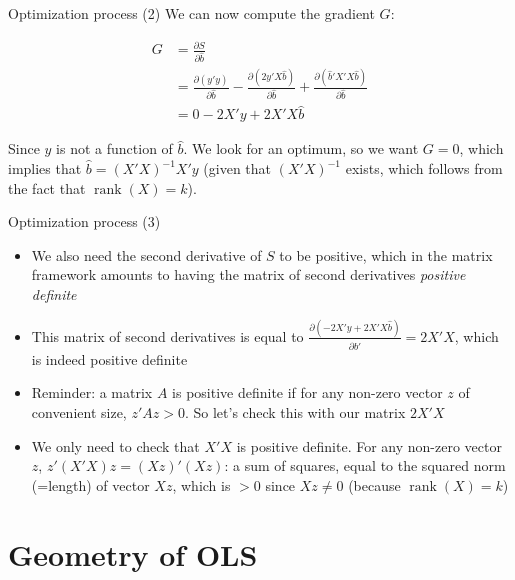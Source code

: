 \documentclass[aspectratio=169]{beamer}
\begin{document}
\begin{frame}{Optimization process (2)}
We can now compute the gradient $G$:

\begin{align*}
G &= \frac{\partial S}{\partial \hat{b}}\\
&= \frac{\partial(y'y)}{\partial \hat{b}} - \frac{\partial(2y'X\hat{b})}{\partial \hat{b}} + \frac{\partial(\hat{b}'X'X\hat{b})}{\partial \hat{b}}\\
&= 0 - 2X'y + 2X'X\hat{b}
\end{align*}

Since $y$ is not a function of $\hat{b}$. We look for an optimum, so we want $G = 0$, which implies that $\hat{b} = (X'X)^{-1}X'y$ (given that $(X'X)^{-1}$ exists, which follows from the fact that $\operatorname{rank}(X) = k$).
\end{frame}

\begin{frame}{Optimization process (3)}
\begin{itemize}
    \item We also need the second derivative of $S$ to be positive, which in the matrix framework amounts to having the matrix of second derivatives \textit{positive definite}
    \item This matrix of second derivatives is equal to $\frac{\partial(-2X'y+2X'X\hat{b})}{\partial \hat{b}'} = 2X'X$, which is indeed positive definite
    \item Reminder: a matrix $A$ is positive definite if for any non-zero vector $z$ of convenient size, $z'Az > 0$. So let's check this with our matrix $2X'X$
    \item We only need to check that $X'X$ is positive definite. For any non-zero vector $z$, $z'(X'X)z = (Xz)'(Xz)$: a sum of squares, equal to the squared norm (=length) of vector $Xz$, which is $> 0$ since $Xz \neq 0$ (because $\operatorname{rank}(X) = k$)
\end{itemize}
\end{frame}

\section{Geometry of OLS}
\end{document}

